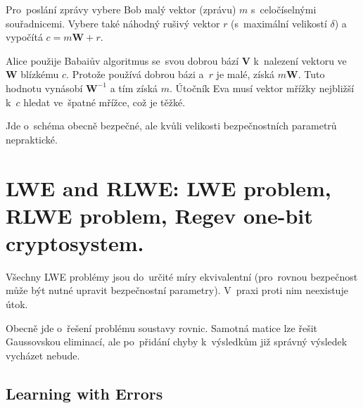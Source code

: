 Pro~poslání zprávy vybere Bob malý vektor (zprávu) $m$ s~celočíselnými souřadnicemi.
Vybere také náhodný rušivý vektor $r$ (s~maximální velikostí $\delta$) a vypočítá
$c = m\textbf{W} + r$.

Alice použije Babaiův algoritmus se~svou dobrou bází $\textbf{V}$ k~nalezení vektoru ve~$\textbf{W}$ blízkému $c$.
Protože používá dobrou bázi a~$r$ je malé, získá $m\textbf{W}$.
Tuto hodnotu vynásobí $\textbf{W}^{-1}$ a tím získá $m$.
Útočník Eva musí vektor mřížky nejbližší k~$c$ hledat ve~špatné mřížce, což je těžké.

Jde o~schéma obecně bezpečné, ale kvůli velikosti bezpečnostních parametrů nepraktické.


\clearpage
\section{LWE and RLWE: LWE problem, RLWE problem, Regev one-bit cryptosystem.}

Všechny LWE problémy jsou do~určité míry ekvivalentní (pro~rovnou bezpečnost může být nutné upravit bezpečnostní parametry).
V~praxi proti nim neexistuje útok.

Obecně jde o~řešení problému soustavy rovnic.
Samotná matice lze řešit Gaussovskou eliminací, ale po~přidání chyby k~výsledkům již správný výsledek vycházet nebude.


\subsection{Learning with Errors}

